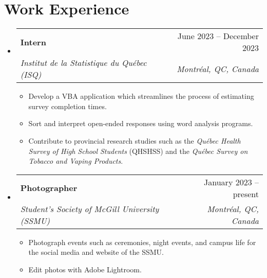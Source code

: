 \documentclass[letterpaper,11pt]{article}
\makeatletter
\newcommand{\resumeItem}[1]{
  \item{
    {#1 \vspace{-4pt}}
  }
}
\newcommand{\resumeSubheading}[4]{
  \vspace{-2pt}\item
    \begin{tabular*}{0.97\textwidth}[t]{l@{\extracolsep{\fill}}r}
      \textbf{#1} & #2 \\
      \textit{\small #3} & \textit{\small #4} \\
    \end{tabular*}\vspace{-10pt}
}
\newcommand{\resumeSubHeadingListStart}{\begin{itemize}[leftmargin=0.15in, label={}]}
\newcommand{\resumeSubHeadingListEnd}{\end{itemize}}
\newcommand{\resumeItemListStart}{\begin{itemize}}
\newcommand{\resumeItemListEnd}{\end{itemize}\vspace{-2pt}}
\makeatother
\begin{document}
%

\section{Work Experience}
\resumeSubHeadingListStart
    \resumeSubheading
      {Intern}{June 2023 -- December 2023}
      {Institut de la Statistique du Québec (ISQ)}{Montréal, QC, Canada}
      \resumeItemListStart
        \small\resumeItem{Develop a VBA application which streamlines the process of estimating survey completion times.}
        \resumeItem{Sort and interpret open-ended responses using word analysis programs.}
        \resumeItem{Contribute to provincial research studies such as the \textit{Québec Health Survey of High School Students} (QHSHSS) and the \textit{Québec Survey on Tobacco and Vaping Products}. }
        \resumeItemListEnd
\resumeSubHeadingListEnd
\resumeSubHeadingListStart
    \resumeSubheading
      {Photographer}{January 2023 -- present}
      {Student's Society of McGill University (SSMU)}{Montréal, QC, Canada}
      \resumeItemListStart
        \small\resumeItem{Photograph events such as ceremonies, night events, and campus life for the social media and website of the SSMU.}
        \resumeItem{Edit photos with Adobe Lightroom.}
        \resumeItemListEnd
\resumeSubHeadingListEnd


\end{document}
